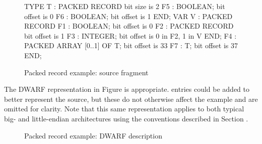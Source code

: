 \begin{figure}[ht]
\begin{nlnlisting}
TYPE T : PACKED RECORD                  { bit size is 2   }
         F5 : BOOLEAN;                  { bit offset is 0 }
         F6 : BOOLEAN;                  { bit offset is 1 }
         END;
VAR V :  PACKED RECORD
         F1 : BOOLEAN;                  { bit offset is 0 }
         F2 : PACKED RECORD             { bit offset is 1 }
              F3 : INTEGER;             { bit offset is 0 in F2, 
                                          1 in V }
              END;
         F4 : PACKED ARRAY [0..1] OF T; { bit offset is 33 }
         F7 : T;                        { bit offset is 37 }
         END;
\end{nlnlisting}
\caption{Packed record example: source fragment}
\label{fig:packedrecordexamplesourcefragment}
\end{figure}

The DWARF representation in 
Figure  
is appropriate. 
\DWTAGpackedtype{} entries could be added to
better represent the source, but these do not otherwise affect
the example and are omitted for clarity. Note that this same
representation applies to both typical big- and 
little-endian
architectures using the conventions described in 
Section .

\begin{figure}[ht]
\caption{Packed record example: DWARF description}
\label{fig:packedrecordexampledwarfdescription}
\end{figure}

